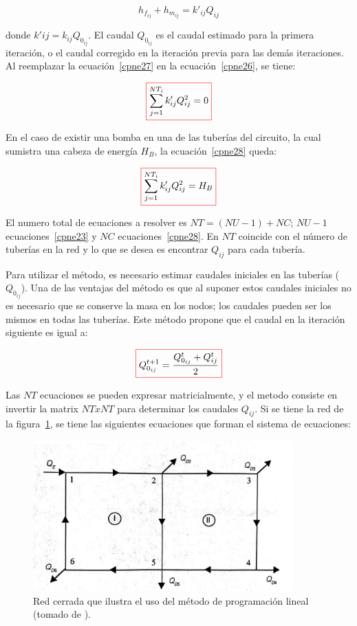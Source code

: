 \documentclass[11pt, oneside]{article}
\begin{document}
\begin{equation}
h_{f_{ij}}+h_{m_{ij}}= k'_{ij}Q_{ij}
\label{cpne27}
\end{equation}

donde $k'{ij} = k_{ij}Q_{0_{ij}}$. El caudal $Q_{0_{ij}}$ es el caudal estimado para la primera iteraci\'on, o el caudal corregido en la iteraci\'on previa para las dem\'as iteraciones. Al reemplazar la ecuaci\'on~\ref{cpne27} en la ecuaci\'on~\ref{cpne26}, se tiene:

\begin{equation}
\color{red}\boxed{\color{black} \sum_{j=1}^{NT_i} k'_{ij}Q_{ij}^2 = 0}
\label{cpne28}
\end{equation}

En el caso de existir una bomba en una de las tuber\'ias del circuito, la cual sumistra una cabeza de energ\'ia $H_B$, la ecuaci\'on~\ref{cpne28} queda:

\begin{equation}
\color{red}\boxed{\color{black} \sum_{j=1}^{NT_i} k'_{ij}Q_{ij}^2 = H_B }
\label{cpne29}
\end{equation}

El numero total de ecuaciones a resolver es $NT=(NU-1) + NC$; $NU-1$ ecuaciones~\ref{cpne23} y $NC$ ecuaciones~\ref{cpne28}. En $NT$ coincide con el n\'umero de tuber\'ias en la red y lo que se desea es encontrar $Q_{ij}$ para cada tuber\'ia. 

Para utilizar el m\'etodo, es necesario estimar caudales iniciales en las tuber\'ias ($Q_{0_{ij}}$). Una de las ventajas del m\'etodo es que al suponer estos caudales iniciales no es necesario que se conserve la masa en los nodos; los caudales pueden ser los mismos en todas las tuber\'ias. Este m\'etodo propone que el caudal en la iteraci\'on siguiente es igual a:

\begin{equation}
\color{red}\boxed{\color{black} Q_{0_{ij}}^{t+1} = \frac{Q_{0_{ij}}^{t} + Q_{ij}^t}{2} }
\label{cpne30}
\end{equation}

Las $NT$ ecuaciones se pueden expresar matricialmente, y el metodo consiste en invertir la matrix $NT x NT$ para determinar los caudales $Q_{ij}$. Si se tiene la red de la figura~\ref{cpnf}, se tiene las siguientes ecuaciones que forman el sistema de ecuaciones:

\begin{figure}[h]
\centering
\includegraphics[width=10cm]{./figs/cpnf.jpeg}
\caption{Red cerrada que ilustra el uso del m\'etodo de programaci\'on lineal (tomado de \cite{saldarriaga}).} 
\label{cpnf}
\end{figure}
\end{document}
